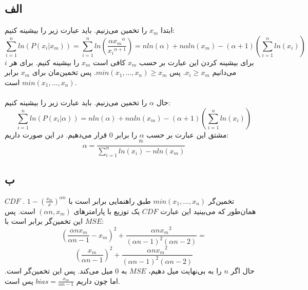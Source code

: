 

\subsection*{الف}
ابتدا $x_m$ را تخمین می‌زنیم. باید عبارت زیر را بیشینه کنیم:
$$\sum_{i=1}^{n} ln(P(x_i|x_m)) = \sum_{i=1}^{n} ln(\frac{\alpha{x_m}^\alpha}{{x_i}^{\alpha+1}}) = nln(\alpha)+n\alpha ln(x_m)-(\alpha+1)(\sum_{i=1}^{n} ln(x_i))$$
برای بیشینه کردن این عبارت بر حسب $x_m$ کافی است $x_m$ را بیشینه کنیم. برای هر $i$ می‌دانیم $x_i \geq x_m$. پس $min(x_1, ..., x_n) \geq x_m$. پس تخمین‌مان برای $x_m$ برابر $min(x_1, ..., x_n)$ است.
\\
\\
حال $\alpha$ را تخمین می‌زنیم. باید عبارت زیر را بیشینه کنیم:
$$\sum_{i=1}^{n} ln(P(x_i|\alpha)) = nln(\alpha)+n\alpha ln(x_m)-(\alpha+1)(\sum_{i=1}^{n} ln(x_i))$$
مشتق این عبارت بر حسب $\alpha$ را برابر $0$ قرار می‌دهیم. در این صورت داریم:
$$\alpha = \frac{n}{\sum_{i=1}^{n} ln(x_i) - nln(x_m)}$$

\subsection*{ب}
$CDF$ 
تخمین‌گر $min(x_1, ..., x_n)$ طبق راهنمایی برابر است با 
$1 - (\frac{x_m}{x})^{\alpha n}$
. همان‌طور که می‌بینید این عبارت $CDF$ یک توزیع  با پارامترهای $(\alpha n, x_m)$ است. پس $MSE$ این تخمین‌گر برابر است با:
$$(\frac{\alpha nx_m}{\alpha n- 1} - x_m)^2 + \frac{\alpha n{x_m}^2}{(\alpha n- 1)^2(\alpha n- 2)} = $$
$$(\frac{x_m}{\alpha n- 1})^2 + \frac{\alpha n{x_m}^2}{(\alpha n- 1)^2(\alpha n- 2)}$$
حال اگر $n$ را به بی‌نهایت میل دهیم، $MSE$ به $0$ میل می‌کند. پس این تخمین‌گر  است. اما چون داریم $bias=\frac{x_m}{\alpha n- 1}$ پس  است.